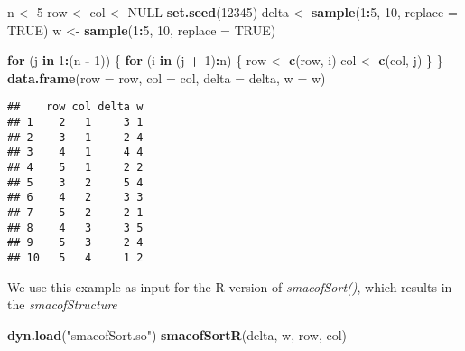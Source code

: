\documentclass[
  12pt,
]{article}
\newenvironment{Shaded}{\begin{snugshade}}{\end{snugshade}}
\newcommand{\AttributeTok}[1]{\textcolor[rgb]{0.13,0.29,0.53}{#1}}
\newcommand{\ConstantTok}[1]{\textcolor[rgb]{0.56,0.35,0.01}{#1}}
\newcommand{\ControlFlowTok}[1]{\textcolor[rgb]{0.13,0.29,0.53}{\textbf{#1}}}
\newcommand{\DecValTok}[1]{\textcolor[rgb]{0.00,0.00,0.81}{#1}}
\newcommand{\FunctionTok}[1]{\textcolor[rgb]{0.13,0.29,0.53}{\textbf{#1}}}
\newcommand{\NormalTok}[1]{#1}
\newcommand{\OtherTok}[1]{\textcolor[rgb]{0.56,0.35,0.01}{#1}}
\newcommand{\SpecialCharTok}[1]{\textcolor[rgb]{0.81,0.36,0.00}{\textbf{#1}}}
\newcommand{\StringTok}[1]{\textcolor[rgb]{0.31,0.60,0.02}{#1}}
\begin{document}
\begin{Shaded}
\begin{Highlighting}[]
\NormalTok{n }\OtherTok{\textless{}{-}} \DecValTok{5}
\NormalTok{row }\OtherTok{\textless{}{-}}\NormalTok{ col }\OtherTok{\textless{}{-}} \ConstantTok{NULL}
\FunctionTok{set.seed}\NormalTok{(}\DecValTok{12345}\NormalTok{)}
\NormalTok{delta }\OtherTok{\textless{}{-}} \FunctionTok{sample}\NormalTok{(}\DecValTok{1}\SpecialCharTok{:}\DecValTok{5}\NormalTok{, }\DecValTok{10}\NormalTok{, }\AttributeTok{replace =} \ConstantTok{TRUE}\NormalTok{)}
\NormalTok{w }\OtherTok{\textless{}{-}} \FunctionTok{sample}\NormalTok{(}\DecValTok{1}\SpecialCharTok{:}\DecValTok{5}\NormalTok{, }\DecValTok{10}\NormalTok{, }\AttributeTok{replace =} \ConstantTok{TRUE}\NormalTok{)}

\ControlFlowTok{for}\NormalTok{ (j }\ControlFlowTok{in} \DecValTok{1}\SpecialCharTok{:}\NormalTok{(n }\SpecialCharTok{{-}} \DecValTok{1}\NormalTok{)) \{}
  \ControlFlowTok{for}\NormalTok{ (i }\ControlFlowTok{in}\NormalTok{ (j }\SpecialCharTok{+} \DecValTok{1}\NormalTok{)}\SpecialCharTok{:}\NormalTok{n) \{}
\NormalTok{    row }\OtherTok{\textless{}{-}} \FunctionTok{c}\NormalTok{(row, i)}
\NormalTok{    col }\OtherTok{\textless{}{-}} \FunctionTok{c}\NormalTok{(col, j)}
\NormalTok{  \}}
\NormalTok{\}}
\FunctionTok{data.frame}\NormalTok{(}\AttributeTok{row =}\NormalTok{ row, }\AttributeTok{col =}\NormalTok{ col, }\AttributeTok{delta =}\NormalTok{ delta, }\AttributeTok{w =}\NormalTok{ w)}
\end{Highlighting}
\end{Shaded}

\begin{verbatim}
##    row col delta w
## 1    2   1     3 1
## 2    3   1     2 4
## 3    4   1     4 4
## 4    5   1     2 2
## 5    3   2     5 4
## 6    4   2     3 3
## 7    5   2     2 1
## 8    4   3     3 5
## 9    5   3     2 4
## 10   5   4     1 2
\end{verbatim}

We use this example as input for the R version of \emph{smacofSort()}, which results in the
\emph{smacofStructure}

\begin{Shaded}
\begin{Highlighting}[]
\FunctionTok{dyn.load}\NormalTok{(}\StringTok{"smacofSort.so"}\NormalTok{)}
\FunctionTok{smacofSortR}\NormalTok{(delta, w, row, col)}
\end{Highlighting}
\end{Shaded}
\end{document}
